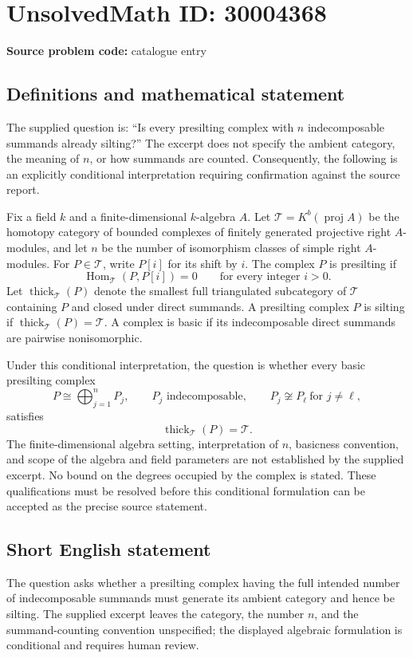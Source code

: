 \documentclass[11pt]{article}
\begin{document}
\section*{UnsolvedMath ID: 30004368}
\textbf{Source problem code:} catalogue entry
\subsection{Definitions and mathematical statement}
The supplied question is: ``Is every presilting complex with \(n\) indecomposable summands already silting?'' The excerpt does not specify the ambient category, the meaning of \(n\), or how summands are counted. Consequently, the following is an explicitly conditional interpretation requiring confirmation against the source report.

Fix a field \(k\) and a finite-dimensional \(k\)-algebra \(A\). Let \(\mathcal T=K^b(\operatorname{proj} A)\) be the homotopy category of bounded complexes of finitely generated projective right \(A\)-modules, and let \(n\) be the number of isomorphism classes of simple right \(A\)-modules. For \(P\in\mathcal T\), write \(P[i]\) for its shift by \(i\). The complex \(P\) is presilting if
\[
\operatorname{Hom}_{\mathcal T}(P,P[i])=0
\qquad\text{for every integer }i>0.
\]
Let \(\operatorname{thick}_{\mathcal T}(P)\) denote the smallest full triangulated subcategory of \(\mathcal T\) containing \(P\) and closed under direct summands. A presilting complex \(P\) is silting if \(\operatorname{thick}_{\mathcal T}(P)=\mathcal T\). A complex is basic if its indecomposable direct summands are pairwise nonisomorphic.

Under this conditional interpretation, the question is whether every basic presilting complex
\[
P\cong\bigoplus_{j=1}^{n}P_j,
\qquad P_j\text{ indecomposable},\qquad
P_j\not\cong P_\ell\ \text{for }j\ne\ell,
\]
satisfies
\[
\operatorname{thick}_{\mathcal T}(P)=\mathcal T.
\]
The finite-dimensional algebra setting, interpretation of \(n\), basicness convention, and scope of the algebra and field parameters are not established by the supplied excerpt. No bound on the degrees occupied by the complex is stated. These qualifications must be resolved before this conditional formulation can be accepted as the precise source statement.
\subsection{Short English statement}
The question asks whether a presilting complex having the full intended number of indecomposable summands must generate its ambient category and hence be silting. The supplied excerpt leaves the category, the number \(n\), and the summand-counting convention unspecified; the displayed algebraic formulation is conditional and requires human review.
\end{document}
